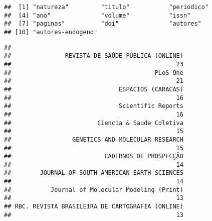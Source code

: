 \documentclass[]{article}
\newenvironment{Shaded}{\begin{snugshade}}{\end{snugshade}}
\newcommand{\KeywordTok}[1]{\textcolor[rgb]{0.13,0.29,0.53}{\textbf{#1}}}
\newcommand{\DataTypeTok}[1]{\textcolor[rgb]{0.13,0.29,0.53}{#1}}
\newcommand{\DecValTok}[1]{\textcolor[rgb]{0.00,0.00,0.81}{#1}}
\newcommand{\StringTok}[1]{\textcolor[rgb]{0.31,0.60,0.02}{#1}}
\newcommand{\OtherTok}[1]{\textcolor[rgb]{0.56,0.35,0.01}{#1}}
\newcommand{\OperatorTok}[1]{\textcolor[rgb]{0.81,0.36,0.00}{\textbf{#1}}}
\newcommand{\NormalTok}[1]{#1}
\begin{document}
\begin{Shaded}
\end{Shaded}

\begin{verbatim}
##  [1] "natureza"         "titulo"           "periodico"       
##  [4] "ano"              "volume"           "issn"            
##  [7] "paginas"          "doi"              "autores"         
## [10] "autores-endogeno"
\end{verbatim}

\begin{Shaded}
\end{Shaded}

\begin{verbatim}
## 
##               REVISTA DE SAÚDE PÚBLICA (ONLINE) 
##                                              23 
##                                        PLoS One 
##                                              21 
##                              ESPACIOS (CARACAS) 
##                                              16 
##                              Scientific Reports 
##                                              16 
##                        Ciencia & Saude Coletiva 
##                                              15 
##                 GENETICS AND MOLECULAR RESEARCH 
##                                              15 
##                          CADERNOS DE PROSPECÇÃO 
##                                              14 
##        JOURNAL OF SOUTH AMERICAN EARTH SCIENCES 
##                                              14 
##           Journal of Molecular Modeling (Print) 
##                                              13 
## RBC. REVISTA BRASILEIRA DE CARTOGRAFIA (ONLINE) 
##                                              13
\end{verbatim}

\begin{Shaded}
\end{Shaded}
\end{document}

